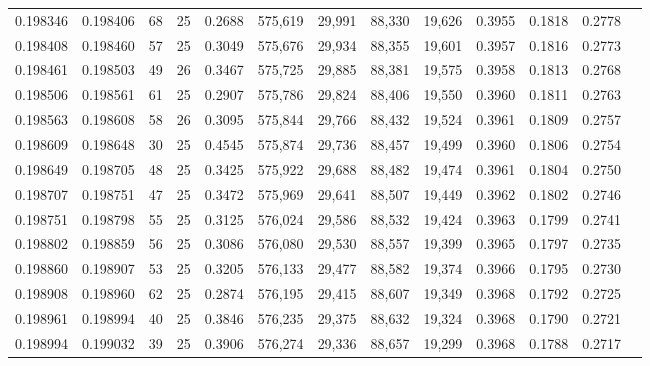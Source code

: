\begin{tabular}{rrrrrrrrrrrrr}
0.198346 & 0.198406 &  68 &  25 &                                     0.2688 & 575,619 &  29,991 &  88,330 &  19,626 & 0.3955 & 0.1818 & 0.2778 \\
0.198408 & 0.198460 &  57 &  25 &                                     0.3049 & 575,676 &  29,934 &  88,355 &  19,601 & 0.3957 & 0.1816 & 0.2773 \\
0.198461 & 0.198503 &  49 &  26 &                                     0.3467 & 575,725 &  29,885 &  88,381 &  19,575 & 0.3958 & 0.1813 & 0.2768 \\
0.198506 & 0.198561 &  61 &  25 &                                     0.2907 & 575,786 &  29,824 &  88,406 &  19,550 & 0.3960 & 0.1811 & 0.2763 \\
0.198563 & 0.198608 &  58 &  26 &                                     0.3095 & 575,844 &  29,766 &  88,432 &  19,524 & 0.3961 & 0.1809 & 0.2757 \\
0.198609 & 0.198648 &  30 &  25 &                                     0.4545 & 575,874 &  29,736 &  88,457 &  19,499 & 0.3960 & 0.1806 & 0.2754 \\
0.198649 & 0.198705 &  48 &  25 &                                     0.3425 & 575,922 &  29,688 &  88,482 &  19,474 & 0.3961 & 0.1804 & 0.2750 \\
0.198707 & 0.198751 &  47 &  25 &                                     0.3472 & 575,969 &  29,641 &  88,507 &  19,449 & 0.3962 & 0.1802 & 0.2746 \\
0.198751 & 0.198798 &  55 &  25 &                                     0.3125 & 576,024 &  29,586 &  88,532 &  19,424 & 0.3963 & 0.1799 & 0.2741 \\
0.198802 & 0.198859 &  56 &  25 &                                     0.3086 & 576,080 &  29,530 &  88,557 &  19,399 & 0.3965 & 0.1797 & 0.2735 \\
0.198860 & 0.198907 &  53 &  25 &                                     0.3205 & 576,133 &  29,477 &  88,582 &  19,374 & 0.3966 & 0.1795 & 0.2730 \\
0.198908 & 0.198960 &  62 &  25 &                                     0.2874 & 576,195 &  29,415 &  88,607 &  19,349 & 0.3968 & 0.1792 & 0.2725 \\
0.198961 & 0.198994 &  40 &  25 &                                     0.3846 & 576,235 &  29,375 &  88,632 &  19,324 & 0.3968 & 0.1790 & 0.2721 \\
0.198994 & 0.199032 &  39 &  25 &                                     0.3906 & 576,274 &  29,336 &  88,657 &  19,299 & 0.3968 & 0.1788 & 0.2717 \\

\end{tabular}
